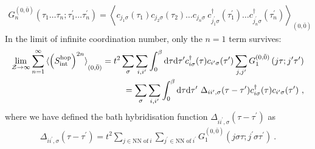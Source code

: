 \documentclass[reprint,hidelinks,onecolumn]{revtex4-2}
\begin{document}
\begin{equation}\begin{aligned}
	G_n^{(0,\bar 0)}\left(\tau_1\ldots \tau_n; \tau_1^\prime\ldots \tau_n^\prime\right) = \left<c_{j_1\sigma}(\tau_{1})c_{j_2\sigma}(\tau_{2})\ldots c_{j_n\sigma} ~ c^\dagger_{j_1^\prime\sigma}(\tau_{1}^\prime)\ldots c^\dagger_{j_n^\prime\sigma}(\tau_{n}^\prime) \right>_{(0,{\bar 0})} 
\end{aligned}\end{equation}
In the limit of infinite coordination number, only the \(n=1\) term survives:
\begin{equation}\begin{aligned}
	\lim_{\mathcal{Z}\to \infty}\sum_{n=1}^\infty \braket{\left(S_\text{int}^\text{hop}\right)^{2n}}_{(0,{\bar 0})} = t^2\sum_{\sigma}\sum_{i,i^\prime}\int_0^\beta\mathrm{d\tau}\mathrm{d\tau^\prime}c^\dagger_{i\sigma}(\tau)c_{i^\prime\sigma}(\tau^\prime)\sum_{j,j^\prime}G_1^{(0,\bar 0)}\left(j\tau; j^\prime\tau^\prime\right) \\
	= \sum_{\sigma}\sum_{i,i^\prime}\int_0^\beta\mathrm{d\tau}\mathrm{d\tau^\prime}~\Delta_{ii^\prime,\sigma}(\tau - \tau^\prime)c^\dagger_{i\sigma}(\tau)c_{i^\prime\sigma}(\tau^\prime)~,
\end{aligned}\end{equation}
where we have defined the bath hybridisation function \(\Delta_{ii^\prime,\sigma}(\tau - \tau^\prime)\) as
\begin{equation}\begin{aligned}
	\Delta_{ii^\prime,\sigma}(\tau - \tau^\prime) = t^2\sum_{j \in \text{NN of}~i}\sum_{j^\prime \in \text{NN of}~i^\prime}G_1^{(0,\bar 0)}\left(j\sigma\tau; j^\prime\sigma\tau^\prime\right)~.
\end{aligned}\end{equation}
\end{document}
